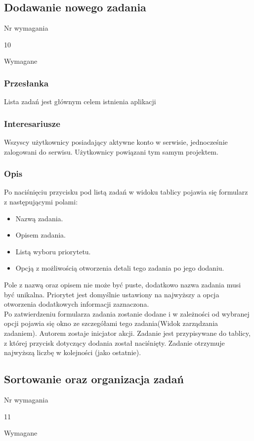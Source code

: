 \documentclass[eng,printmode]{mgr}
\begin{document}
\subsection{Dodawanie nowego zadania}
\begin{labeling}{Nr wymagania}
\item [Nr wymagania:] 10
\item [Priorytet:] Wymagane
\end{labeling}

\subsubsection{Przesłanka}
Lista zadań jest głównym celem istnienia aplikacji

\subsubsection{Interesariusze}
Wszyscy użytkownicy posiadający aktywne konto w serwisie, jednocześnie zalogowani do serwisu. Użytkownicy powiązani tym samym projektem.

\subsubsection{Opis}
Po naciśnięciu przycisku pod listą zadań w widoku tablicy pojawia się formularz z następującymi polami:
\begin{itemize}
  \item[--] Nazwą zadania.
  \item[--] Opisem zadania.
  \item[--] Listą wyboru priorytetu.
  \item[--] Opcją z możliwością otworzenia detali tego zadania po jego dodaniu.
\end{itemize}
Pole z nazwą oraz opisem nie może być puste, dodatkowo nazwa zadania musi być unikalna. Priorytet jest domyślnie ustawiony na najwyższy a opcja otworzenia dodatkowych informacji zaznaczona.\\
Po zatwierdzeniu formularza zadania zostanie dodane i w zależności od wybranej opcji pojawia się okno ze szczegółami tego zadania(Widok zarządzania zadaniem). Autorem zostaje inicjator akcji. Zadanie jest przypisywane do tablicy, z której przycisk dotyczący dodania został naciśnięty. Zadanie otrzymuje najwyższą liczbę w kolejności (jako ostatnie).

\subsection{Sortowanie oraz organizacja zadań}
\begin{labeling}{Nr wymagania}
\item [Nr wymagania:] 11
\item [Priorytet:] Wymagane
\end{labeling}
\end{document}
